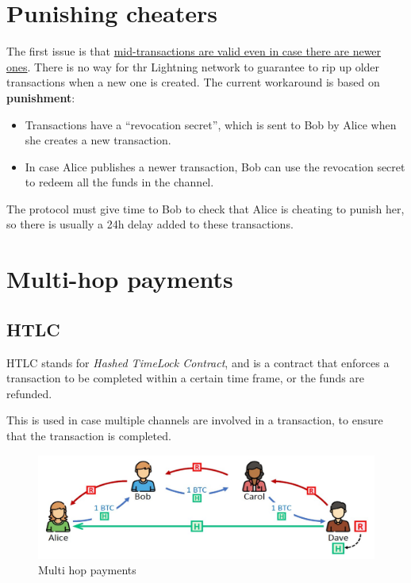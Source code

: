 \section{Punishing cheaters}
The first issue is that \ul{mid-transactions are valid even in case there are newer ones}.
There is no way for thr Lightning network to guarantee to rip up older transactions when a new one is created.
The current workaround is based on \textbf{punishment}:
\begin{itemize}
   \item Transactions have a ``revocation secret'', which is sent to Bob by Alice when she creates a new transaction.
   \item In case Alice publishes a newer transaction, Bob can use the revocation secret to redeem all the funds in the channel.
\end{itemize}
The protocol must give time to Bob to check that Alice is cheating to punish her, so there is usually a 24h delay added to these transactions.

\section{Multi-hop payments}
\subsection{HTLC}
HTLC stands for \textit{Hashed TimeLock Contract}, and is a contract that enforces a transaction to be completed within a certain time frame, or the funds are refunded.

This is used in case multiple channels are involved in a transaction, to ensure that the transaction is completed.

\begin{figure}[htbp]
   \centering
   \includegraphics{images/lightning_HTLC1.png}
   \caption{Multi hop payments}
   \label{fig:lightning_HTLC1}
\end{figure}

